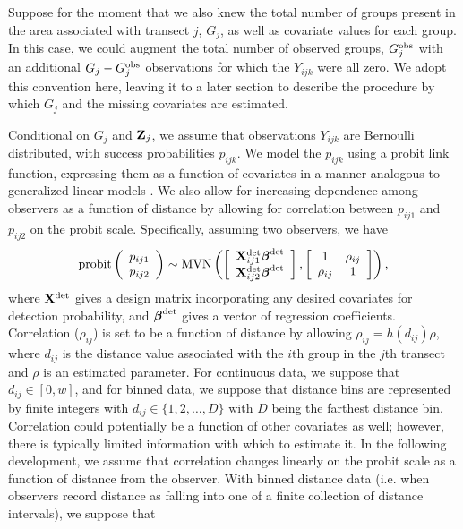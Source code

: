\documentclass[10pt]{article}
\begin{document}
Suppose for the moment that we also knew the total number of groups present in the area associated with transect $j$, $G_j$, as well as covariate values for each group.  In this case, we could augment the total number of observed groups, $G_j^{\rm obs}$ with an additional $G_j-G_j^{\rm obs}$ observations for which the $Y_{ijk}$ were all zero.  We adopt this convention here, leaving it to a later section to describe the procedure by which $G_j$ and the missing covariates are estimated.

Conditional on $G_j$ and ${\bf Z}_j$, we assume that observations $Y_{ijk}$ are Bernoulli distributed, with success probabilities $p_{ijk}$.
We model the $p_{ijk}$ using a probit link function, expressing them as a function of covariates in a manner analogous to generalized linear models \cite{McCullaghNelder1989}.  We also allow for increasing dependence among observers as a function of distance by allowing for correlation between $p_{ij1}$ and $p_{ij2}$ on the probit scale. Specifically, assuming two observers, we have
$$
{\rm probit} \left(\begin{array}{c}
				p_{ij1} \\
				p_{ij2}
		\end{array}\right) \sim {\rm MVN}
\left( \left[ \begin{array}{c}
				{\bf X}_{ij1}^{\rm det} \boldsymbol{\beta}^{\rm det}\\
				{\bf X}_{ij2}^{\rm det} \boldsymbol{\beta}^{\rm det}
		\end{array}\right],
        \left[ \begin{array}{cc}
            1 & \rho_{ij} \\
            \rho_{ij} & 1
        \end{array} \right]
\right),
$$
where ${\bf X}^{\rm det}$ gives a design matrix incorporating any desired covariates for detection probability, and $\boldsymbol{\beta}^{\rm det}$ gives a vector of regression coefficients.  Correlation ($\rho_{ij}$) is set to be a function of distance by allowing $\rho_{ij} = h(d_{ij}) \rho$, where $d_{ij}$ is the distance value associated with the $i$th group in the $j$th transect and $\rho$ is an estimated parameter. For continuous data, we suppose that $d_{ij} \in [0,w]$, and for binned data, we suppose that distance bins are represented by finite integers with $d_{ij} \in \{1,2,\hdots,D\}$ with $D$ being the farthest distance bin. Correlation could potentially be a function of other covariates as well; however, there is typically limited information with which to estimate it. In the following development, we assume that correlation changes linearly on the probit scale as a function of distance from the observer.  With binned distance data (i.e. when observers record distance as falling into one of a finite collection of distance intervals), we suppose that
\end{document}
